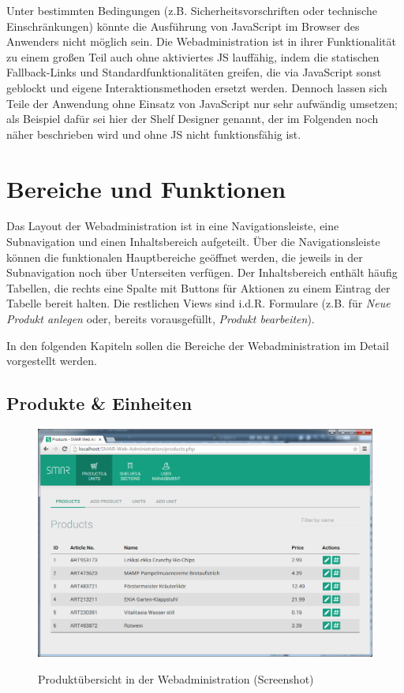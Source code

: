 Unter bestimmten Bedingungen (z.B. Sicherheitsvorschriften oder technische Einschränkungen) könnte die Ausführung von JavaScript im Browser des Anwenders nicht möglich sein. Die Webadministration ist in ihrer Funktionalität zu einem großen Teil auch ohne aktiviertes \acs{JS} lauffähig, indem die statischen Fallback-Links und Standardfunktionalitäten greifen, die via JavaScript sonst geblockt und eigene Interaktionsmethoden ersetzt werden. Dennoch lassen sich Teile der Anwendung ohne Einsatz von JavaScript nur sehr aufwändig umsetzen; als Beispiel dafür sei hier der Shelf Designer genannt, der im Folgenden noch näher beschrieben wird und ohne \acs{JS} nicht funktionsfähig ist.


\section{Bereiche und Funktionen}

Das Layout der Webadministration ist in eine Navigationsleiste, eine Subnavigation und einen Inhaltsbereich aufgeteilt. Über die Navigationsleiste können die funktionalen Hauptbereiche geöffnet werden, die jeweils in der Subnavigation noch über Unterseiten verfügen. Der Inhaltsbereich enthält häufig Tabellen, die rechts eine Spalte mit Buttons für Aktionen zu einem Eintrag der Tabelle bereit halten. Die restlichen Views sind i.d.R. Formulare (z.B. für \emph{Neue Produkt anlegen} oder, bereits vorausgefüllt, \emph{Produkt bearbeiten}).

In den folgenden Kapiteln sollen die Bereiche der Webadministration im Detail vorgestellt werden.

\subsection{Produkte \& Einheiten}

\begin{figure}[H]
	\centering
	{\includegraphics[width=\textwidth]{Bilder/Abbildungen/webadmin_products.png}}
	\caption{Produktübersicht in der Webadministration (Screenshot)}
	\label{fig:webadmin_products}
\end{figure}


